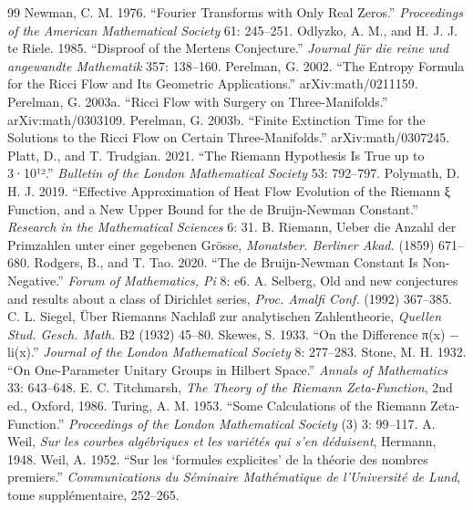 \documentclass[10pt]{article}
\begin{document}
\begin{thebibliography}{99}
 Newman, C. M. 1976. ``Fourier Transforms with Only Real Zeros.'' \emph{Proceedings of the American Mathematical Society} 61: 245--251.
 Odlyzko, A. M., and H. J. J. te Riele. 1985. ``Disproof of the Mertens Conjecture.'' \emph{Journal für die reine und angewandte Mathematik} 357: 138--160.
 Perelman, G. 2002. ``The Entropy Formula for the Ricci Flow and Its Geometric Applications.'' arXiv:math/0211159.
 Perelman, G. 2003a. ``Ricci Flow with Surgery on Three-Manifolds.'' arXiv:math/0303109.
 Perelman, G. 2003b. ``Finite Extinction Time for the Solutions to the Ricci Flow on Certain Three-Manifolds.'' arXiv:math/0307245.
 Platt, D., and T. Trudgian. 2021. ``The Riemann Hypothesis Is True up to 3·10¹².'' \emph{Bulletin of the London Mathematical Society} 53: 792--797.
 Polymath, D. H. J. 2019. ``Effective Approximation of Heat Flow Evolution of the Riemann ξ Function, and a New Upper Bound for the de Bruijn-Newman Constant.'' \emph{Research in the Mathematical Sciences} 6: 31.
 B. Riemann, Ueber die Anzahl der Primzahlen unter einer gegebenen Gr\"osse, \emph{Monatsber. Berliner Akad.} (1859) 671--680.
 Rodgers, B., and T. Tao. 2020. ``The de Bruijn-Newman Constant Is Non-Negative.'' \emph{Forum of Mathematics, Pi} 8: e6.
 A. Selberg, Old and new conjectures and results about a class of Dirichlet series, \emph{Proc. Amalfi Conf.} (1992) 367--385.
 C. L. Siegel, \"Uber Riemanns Nachla\ss{} zur analytischen Zahlentheorie, \emph{Quellen Stud. Gesch. Math.} B2 (1932) 45--80.
 Skewes, S. 1933. ``On the Difference π(x) − li(x).'' \emph{Journal of the London Mathematical Society} 8: 277--283.
 Stone, M. H. 1932. ``On One-Parameter Unitary Groups in Hilbert Space.'' \emph{Annals of Mathematics} 33: 643--648.
 E. C. Titchmarsh, \emph{The Theory of the Riemann Zeta-Function}, 2nd ed., Oxford, 1986.
 Turing, A. M. 1953. ``Some Calculations of the Riemann Zeta-Function.'' \emph{Proceedings of the London Mathematical Society} (3) 3: 99--117.
 A. Weil, \emph{Sur les courbes alg\'ebriques et les vari\'et\'es qui s'en d\'eduisent}, Hermann, 1948.
 Weil, A. 1952. ``Sur les `formules explicites' de la théorie des nombres premiers.'' \emph{Communications du Séminaire Mathématique de l'Université de Lund}, tome supplémentaire, 252--265.
\end{thebibliography}
\end{document}
